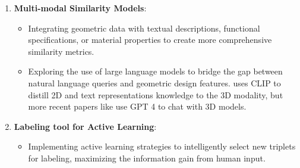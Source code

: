 \begin{enumerate}
    \item \textbf{Multi-modal Similarity Models}: 
    \begin{itemize}
        \item Integrating geometric data with textual descriptions, functional specifications, or material properties to create more comprehensive similarity metrics.
        \item Exploring the use of large language models to bridge the gap between natural language queries and geometric design features. \cite{liuOpenShapeScaling3D2023} uses CLIP to distill 2D and text representations knowledge to the 3D modality, but more recent papers like \cite{qiShapeLLMUniversal3D2024} use GPT 4 to chat with 3D models.
    \end{itemize}


    \item \textbf{Labeling tool for Active Learning}:
    \begin{itemize}
        \item Implementing active learning strategies to intelligently select new triplets for labeling, maximizing the information gain from human input.
    \end{itemize}


\end{enumerate}

